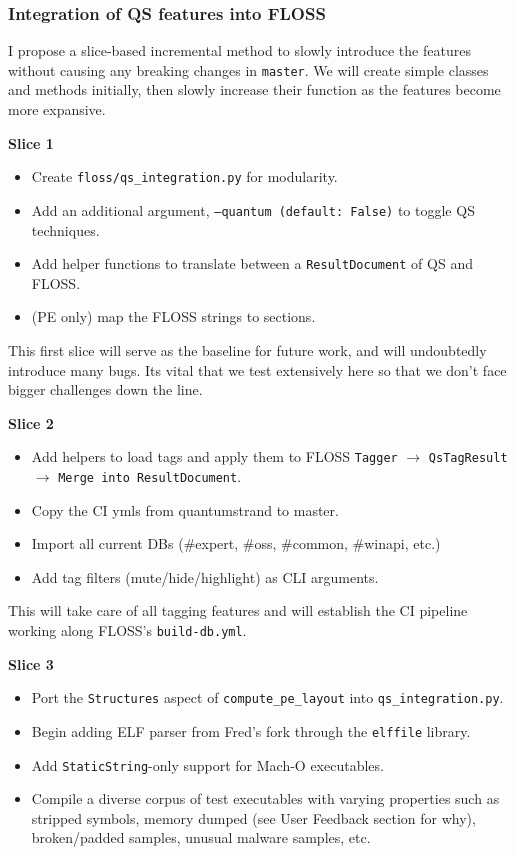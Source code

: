 \documentclass[12pt]{article}
\begin{document}
\subsubsection*{Integration of QS features into FLOSS}
{}

I propose a slice-based incremental method to slowly introduce the features without causing any breaking changes in \texttt{master}. We will create simple classes and methods initially, then slowly increase their function as the features become more expansive.

\textbf{Slice 1}

\begin{itemize}
    \item Create \texttt{floss/qs\_integration.py} for modularity.
    \item Add an additional argument, \texttt{--quantum (default: False)} to toggle QS techniques.
    \item Add helper functions to translate between a \texttt{ResultDocument} of QS and FLOSS.
    \item (PE only) map the FLOSS strings to sections.
\end{itemize}

This first slice will serve as the baseline for future work, and will undoubtedly introduce many bugs. Its vital that we test extensively here so that we don't face bigger challenges down the line.

\textbf{Slice 2}

\begin{itemize}
    \item Add helpers to load tags and apply them to FLOSS \texttt{Tagger} $\to$ \texttt{QsTagResult} $\to$ \texttt{Merge into ResultDocument}.
    \item Copy the CI ymls from quantumstrand to master.
    \item Import all current DBs (\#expert, \#oss, \#common, \#winapi, etc.)
    \item Add tag filters (mute/hide/highlight) as CLI arguments.
\end{itemize}

This will take care of all tagging features and will establish the CI pipeline working along FLOSS's \texttt{build-db.yml}.

\textbf{Slice 3}

\begin{itemize}
    \item Port the \texttt{Structures} aspect of \texttt{compute\_pe\_layout} into \texttt{qs\_integration.py}.
    \item Begin adding ELF parser from Fred's fork through the \texttt{elffile} library.
    \item Add \texttt{StaticString}-only support for Mach-O executables.
    \item Compile a diverse corpus of test executables with varying properties such as stripped symbols, memory dumped (see User Feedback section for why), broken/padded samples, unusual malware samples, etc.
\end{itemize}
\end{document}
